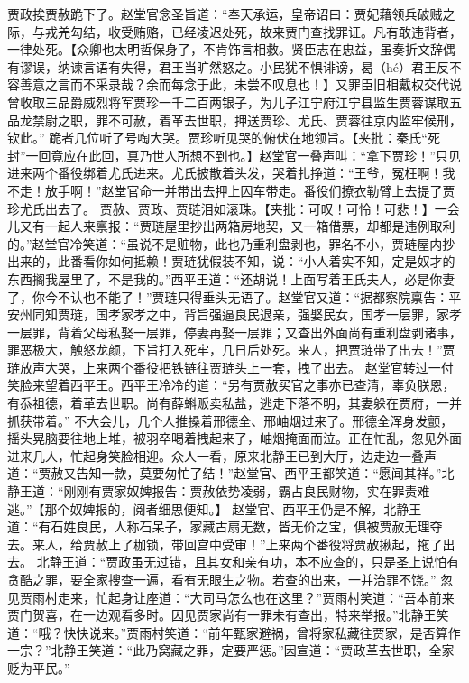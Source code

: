 \documentclass[12pt,oneside]{book}
\begin{document}
贾政挨贾赦跪下了。赵堂官念圣旨道：“奉天承运，皇帝诏曰：贾妃藉领兵破贼之际，与戎羌勾结，收受贿赂，已经凌迟处死，故来贾门查找罪证。凡有敢违背者，一律处死。【众卿也太明哲保身了，不肯饰言相救。贤臣志在忠益，虽奏折文辞偶有谬误，纳谏言语有失得，君王当旷然怒之。小民犹不惧诽谤，曷（hé）君王反不容善意之言而不采录哉？余而每念于此，未尝不叹息也！】又罪臣旧相戴权交代说曾收取三品爵威烈将军贾珍一千二百两银子，为儿子江宁府江宁县监生贾蓉谋取五品龙禁尉之职，罪不可赦，着革去世职，押送贾珍、尤氏、贾蓉往京内监牢候刑，钦此。”
跪者几位听了号啕大哭。贾珍听见哭的俯伏在地领旨。【夹批：秦氏“死封”一回竟应在此回，真乃世人所想不到也。】赵堂官一叠声叫：“拿下贾珍！”只见进来两个番役绑着尤氏进来。尤氏披散着头发，哭着扎挣道：“王爷，冤枉啊！我不走！放手啊！”赵堂官命一并带出去押上囚车带走。番役们撩衣勒臂上去提了贾珍尤氏出去了。
贾赦、贾政、贾琏泪如滚珠。【夹批：可叹！可怜！可悲！】一会儿又有一起人来禀报：“贾琏屋里抄出两箱房地契，又一箱借票，却都是违例取利的。”赵堂官冷笑道：“虽说不是赃物，此也乃重利盘剥也，罪名不小，贾琏屋内抄出来的，此番看你如何抵赖！贾琏犹假装不知，说：“小人着实不知，定是奴才的东西搁我屋里了，不是我的。”西平王道：“还胡说！上面写着王氏夫人，必是你妻了，你今不认也不能了！”贾琏只得垂头无语了。赵堂官又道：“据都察院禀告：平安州同知贾琏，国孝家孝之中，背旨强逼良民退亲，强娶民女，国孝一层罪，家孝一层罪，背着父母私娶一层罪，停妻再娶一层罪；又查出外面尚有重利盘剥诸事，罪恶极大，触怒龙颜，下旨打入死牢，几日后处死。来人，把贾琏带了出去！”贾琏放声大哭，上来两个番役把铁链往贾琏头上一套，拽了出去。
赵堂官转过一付笑脸来望着西平王。西平王冷冷的道：“另有贾赦买官之事亦已查清，辜负朕恩，有忝祖德，着革去世职。尚有薛蝌贩卖私盐，逃走下落不明，其妻躲在贾府，一并抓获带着。”
不大会儿，几个人推搡着邢德全、邢岫烟过来了。邢德全浑身发颤，摇头晃脑要往地上堆，被羽卒喝着拽起来了，岫烟掩面而泣。正在忙乱，忽见外面进来几人，忙起身笑脸相迎。众人一看，原来北静王已到大厅，边走边一叠声道：“贾赦又告知一款，莫要匆忙了结！”赵堂官、西平王都笑道：“愿闻其祥。”北静王道：“刚刚有贾家奴婢报告：贾赦依势凌弱，霸占良民财物，实在罪责难逃。”【那个奴婢报的，阅者细思便知。】
赵堂官、西平王仍是不解，北静王道：“有石姓良民，人称石呆子，家藏古扇无数，皆无价之宝，俱被贾赦无理夺去。来人，给贾赦上了枷锁，带回宫中受审！”上来两个番役将贾赦揪起，拖了出去。
北静王道：“贾政虽无过错，且其女和亲有功，本不应查的，只是圣上说怕有贪酷之罪，要全家搜查一遍，看有无眼生之物。若查的出来，一并治罪不饶。”
忽见贾雨村走来，忙起身让座道：“大司马怎么也在这里？”贾雨村笑道：“吾本前来贾门贺喜，在一边观看多时。因见贾家尚有一罪未有查出，特来举报。”北静王笑道：“哦？快快说来。”贾雨村笑道：“前年甄家避祸，曾将家私藏往贾家，是否算作一宗？”北静王笑道：“此乃窝藏之罪，定要严惩。”因宣道：“贾政革去世职，全家贬为平民。”
\end{document}
